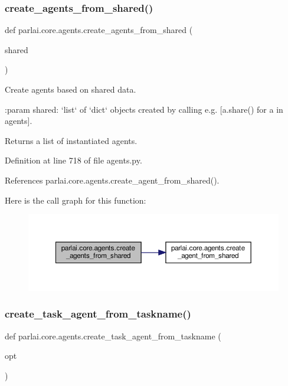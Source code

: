 \subsubsection{\texorpdfstring{create\+\_\+agents\+\_\+from\+\_\+shared()}{create\_agents\_from\_shared()}}
{\footnotesize\ttfamily def parlai.\+core.\+agents.\+create\+\_\+agents\+\_\+from\+\_\+shared (\begin{DoxyParamCaption}\item[{}]{shared }\end{DoxyParamCaption})}

\begin{DoxyVerb}Create agents based on shared data.

:param shared: `list` of `dict` objects created by calling e.g.
    [a.share() for a in agents].

Returns a list of instantiated agents.
\end{DoxyVerb}
 

Definition at line 718 of file agents.\+py.



References parlai.\+core.\+agents.\+create\+\_\+agent\+\_\+from\+\_\+shared().

Here is the call graph for this function\+:
\nopagebreak
\begin{figure}[H]
\begin{center}
\leavevmode
\includegraphics[width=350pt]{namespaceparlai_1_1core_1_1agents_a5600530545f5e60a79e2d657b5af1d8c_cgraph}
\end{center}
\end{figure}
\mbox{\label{namespaceparlai_1_1core_1_1agents_ab4473fa54af02b5ab385b41b51dacd10}} 
\subsubsection{\texorpdfstring{create\+\_\+task\+\_\+agent\+\_\+from\+\_\+taskname()}{create\_task\_agent\_from\_taskname()}}
{\footnotesize\ttfamily def parlai.\+core.\+agents.\+create\+\_\+task\+\_\+agent\+\_\+from\+\_\+taskname (\begin{DoxyParamCaption}\item[{}]{opt }\end{DoxyParamCaption})}

